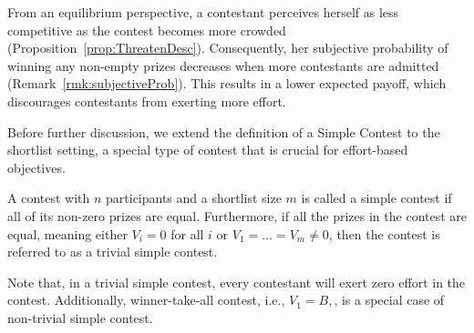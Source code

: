 From an equilibrium perspective, a contestant perceives herself as less competitive as the contest becomes more crowded (Proposition~\ref{prop:ThreatenDesc}). Consequently, her subjective probability of winning any non-empty prizes decreases when more contestants are admitted (Remark~\ref{rmk:subjectiveProb}). This results in a lower expected payoff, which discourages contestants from exerting more effort.

Before further discussion, we extend the definition of a Simple Contest \cite{EGG21} to the shortlist setting, a special type of contest that is crucial for effort-based objectives.

\begin{definition}
    A contest with $n$ participants and a shortlist size $m$ is called a simple contest if all of its non-zero prizes are equal. Furthermore, if all the prizes in the contest are equal, meaning either $V_i = 0$ for all $i$ or $V_1 = \ldots = V_m \neq 0$, then the contest is referred to as a trivial simple contest.
\end{definition}

Note that, in a trivial simple contest, every contestant will exert zero effort in the contest. Additionally, winner-take-all contest, i.e., $V_1=B,$, is a special case of non-trivial simple contest.

